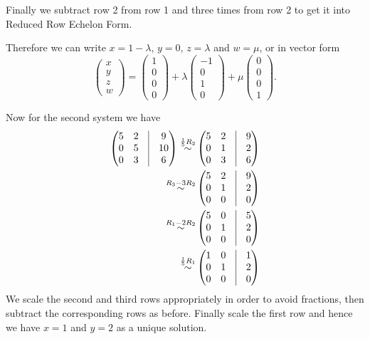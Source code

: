 {\begin{enumext}[label=\arabic*,wrap-label=#1.]
\item Finally we subtract row 2 from row 1 and three times from row 2 to get it into Reduced Row  Echelon Form.
\end{enumext}
Therefore we can write $x = 1 - \lambda$, $y = 0$, $z = \lambda$ and $w = \mu$, or in vector form
\[
\begin{pmatrix}x\\y\\z\\w\end{pmatrix} = \begin{pmatrix}1\\0\\0\\0\end{pmatrix} + \lambda \begin{pmatrix}-1\\0\\1\\0\end{pmatrix} + \mu \begin{pmatrix}0\\0\\0\\1\end{pmatrix}.
\]

Now for the second system we have
\begin{align*}
\begin{pmatrix}
5 & 2 & \vline & 9 \\
0 & 5 & \vline & 10 \\
0 & 3 & \vline & 6
\end{pmatrix}
\overset{\frac{1}{5}R_2}{\sim} &
\begin{pmatrix}
5 & 2 & \vline & 9 \\
0 & 1 & \vline & 2 \\
0 & 3 & \vline & 6
\end{pmatrix}
\\ \overset{R_3 - 3 R_2}{\sim} &
\begin{pmatrix}
5 & 2 & \vline & 9 \\
0 & 1 & \vline & 2 \\
0 & 0 & \vline & 0
\end{pmatrix}
\\ \overset{R_1 - 2 R_2}{\sim} &
\begin{pmatrix}
5 & 0 & \vline & 5 \\
0 & 1 & \vline & 2 \\
0 & 0 & \vline & 0
\end{pmatrix}
\\ \overset{\frac{1}{5}R_1}{\sim} &
\begin{pmatrix}
1 & 0 & \vline & 1 \\
0 & 1 & \vline & 2 \\
0 & 0 & \vline & 0
\end{pmatrix}
\end{align*}
We scale the second and third rows appropriately in order to avoid fractions, then subtract the corresponding rows as before. Finally scale the first row and hence we have $x = 1$ and $y = 2$ as a unique solution.

} %

